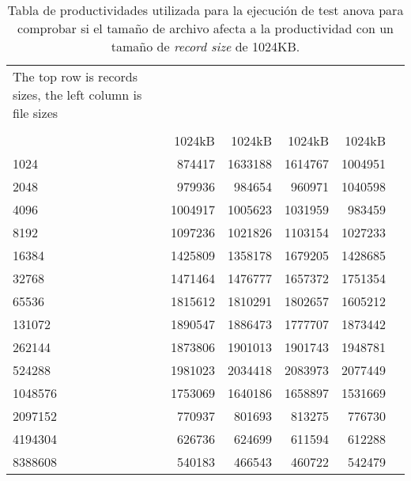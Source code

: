 \begin{table}[H]\centering
\caption{Tabla de productividades utilizada para la ejecución de test anova para comprobar si el tamaño de archivo afecta a la productividad con un tamaño de \textit{record size} de 1024KB.}
\scriptsize
\begin{tabular}{lrrrrr}\toprule
The top row is records sizes, the left column is file sizes & & & & \\
& & & & \\
&1024kB &1024kB &1024kB &1024kB \\\midrule
1024 &874417 &1633188 &1614767 &1004951 \\
2048 &979936 &984654 &960971 &1040598 \\
4096 &1004917 &1005623 &1031959 &983459 \\
8192 &1097236 &1021826 &1103154 &1027233 \\
16384 &1425809 &1358178 &1679205 &1428685 \\
32768 &1471464 &1476777 &1657372 &1751354 \\
65536 &1815612 &1810291 &1802657 &1605212 \\
131072 &1890547 &1886473 &1777707 &1873442 \\
262144 &1873806 &1901013 &1901743 &1948781 \\
524288 &1981023 &2034418 &2083973 &2077449 \\
1048576 &1753069 &1640186 &1658897 &1531669 \\
2097152 &770937 &801693 &813275 &776730 \\
4194304 &626736 &624699 &611594 &612288 \\
8388608 &540183 &466543 &460722 &542479 \\
\bottomrule
\end{tabular}
\end{table}

